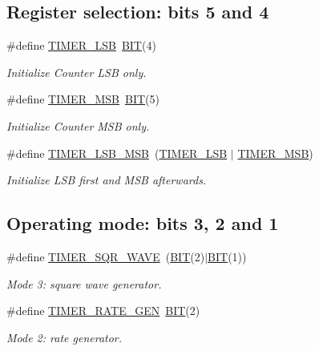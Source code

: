 \subsection*{Register selection\+: bits 5 and 4}
\begin{DoxyCompactItemize}
\item 
\#define \hyperlink{group__i8254_gac18cb814ebd0d67235392c330e0e3504}{T\+I\+M\+E\+R\+\_\+\+L\+SB}~\hyperlink{video__gr_8c_a3a8ea58898cb58fc96013383d39f482c}{B\+IT}(4)
\begin{DoxyCompactList}\small\item\em Initialize Counter L\+SB only. \end{DoxyCompactList}\item 
\#define \hyperlink{group__i8254_ga2a8a6d363c612d756cd8d78480f7cd04}{T\+I\+M\+E\+R\+\_\+\+M\+SB}~\hyperlink{video__gr_8c_a3a8ea58898cb58fc96013383d39f482c}{B\+IT}(5)
\begin{DoxyCompactList}\small\item\em Initialize Counter M\+SB only. \end{DoxyCompactList}\item 
\#define \hyperlink{group__i8254_ga8c0f1933323274c765e23837e4fbc8c7}{T\+I\+M\+E\+R\+\_\+\+L\+S\+B\+\_\+\+M\+SB}~(\hyperlink{group__i8254_gac18cb814ebd0d67235392c330e0e3504}{T\+I\+M\+E\+R\+\_\+\+L\+SB} $\vert$ \hyperlink{group__i8254_ga2a8a6d363c612d756cd8d78480f7cd04}{T\+I\+M\+E\+R\+\_\+\+M\+SB})
\begin{DoxyCompactList}\small\item\em Initialize L\+SB first and M\+SB afterwards. \end{DoxyCompactList}\end{DoxyCompactItemize}
\subsection*{Operating mode\+: bits 3, 2 and 1}
\begin{DoxyCompactItemize}
\item 
\#define \hyperlink{group__i8254_ga4745cbf21da3d3fea5dbb080b2b73bac}{T\+I\+M\+E\+R\+\_\+\+S\+Q\+R\+\_\+\+W\+A\+VE}~(\hyperlink{video__gr_8c_a3a8ea58898cb58fc96013383d39f482c}{B\+IT}(2)$\vert$\hyperlink{video__gr_8c_a3a8ea58898cb58fc96013383d39f482c}{B\+IT}(1))
\begin{DoxyCompactList}\small\item\em Mode 3\+: square wave generator. \end{DoxyCompactList}\item 
\#define \hyperlink{group__i8254_ga5d4449e0fa1cf4a4d107a48a04a1265f}{T\+I\+M\+E\+R\+\_\+\+R\+A\+T\+E\+\_\+\+G\+EN}~\hyperlink{video__gr_8c_a3a8ea58898cb58fc96013383d39f482c}{B\+IT}(2)
\begin{DoxyCompactList}\small\item\em Mode 2\+: rate generator. \end{DoxyCompactList}\end{DoxyCompactItemize}
